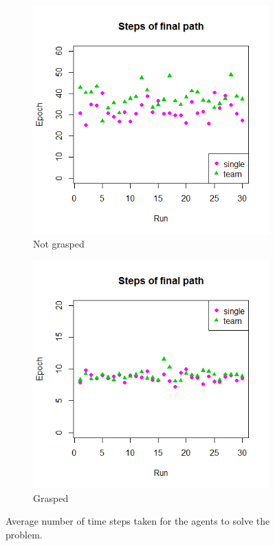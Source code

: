 \begin{figure}
	\centering	
	\begin{subfigure}{.48\textwidth}
		\centering
		\includegraphics[width=\textwidth]{images/Path_notgrabbed.png}
		\caption{Not grasped}
		\label{4c}		
	\end{subfigure}
	\begin{subfigure}{0.48\textwidth}
		\centering
		\includegraphics[width=\textwidth]{images/Path_grabbed.png}
		\caption{Grasped}
		\label{4d}		
	\end{subfigure}
	\caption{Average number of time steps taken for the agents to solve the problem.}
	\label{fig:Results4}
\end{figure}